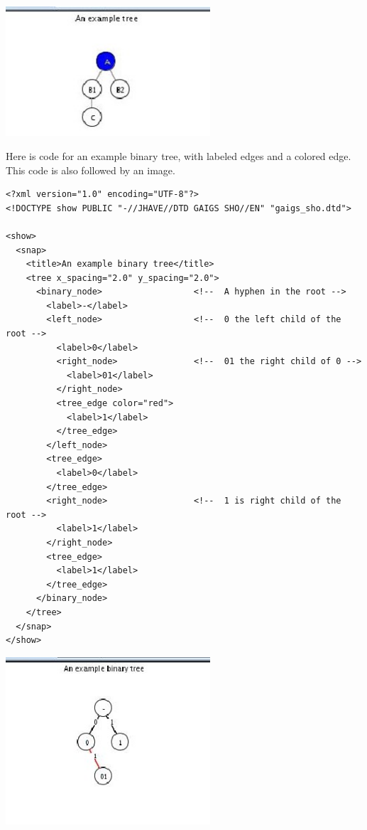 \documentclass[12pt]{article}
\begin{document}
\begin{center}
  \includegraphics[width=3in]{howto_graphics/generaltree.eps}
\end{center}


Here is code for an example binary tree, with labeled edges and a
colored edge. This code is also followed by an image.

\footnotesize \begin{verbatim}
<?xml version="1.0" encoding="UTF-8"?>
<!DOCTYPE show PUBLIC "-//JHAVE//DTD GAIGS SHO//EN" "gaigs_sho.dtd">

<show>
  <snap>
    <title>An example binary tree</title>
    <tree x_spacing="2.0" y_spacing="2.0">
      <binary_node>                  <!--  A hyphen in the root -->
        <label>-</label>  
        <left_node>                  <!--  0 the left child of the root -->
          <label>0</label>  
          <right_node>               <!--  01 the right child of 0 -->
            <label>01</label>
          </right_node>
          <tree_edge color="red">
            <label>1</label>
          </tree_edge>
        </left_node> 
        <tree_edge>
          <label>0</label>
        </tree_edge>
        <right_node>                 <!--  1 is right child of the root -->
          <label>1</label>
        </right_node>
        <tree_edge>
          <label>1</label>
        </tree_edge>
      </binary_node>
    </tree>
  </snap>
</show>
\end{verbatim} \normalsize

\begin{center}
  \includegraphics[width=3in]{howto_graphics/binarytree.eps}
\end{center}
\end{document}
